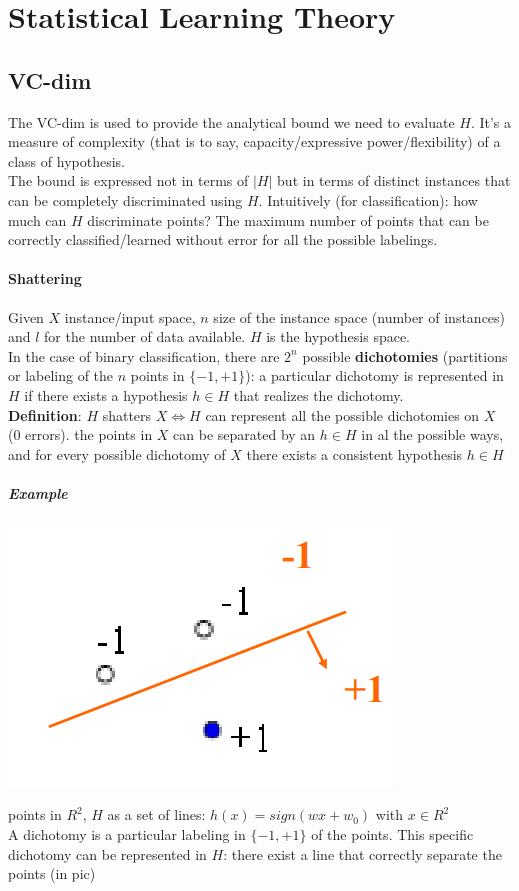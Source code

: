 \documentclass[10pt]{report}
\begin{document}
\section{Statistical Learning Theory}
\subsection{VC-dim} The VC-dim is used to provide the analytical bound we need to evaluate $H$. It's a measure of complexity (that is to say, capacity/expressive power/flexibility) of a class of hypothesis.\\
The bound is expressed not in terms of $|H|$ but in terms of distinct instances that can be completely discriminated using $H$. Intuitively (for classification): how much can $H$ discriminate points? The maximum number of points that can be correctly classified/learned without error for all the possible labelings.
\paragraph{Shattering} Given $X$ instance/input space, $n$ size of the instance space (number of instances) and $l$ for the number of data available. $H$ is the hypothesis space.\\
In the case of binary classification, there are $2^n$ possible \textbf{dichotomies} (partitions or labeling of the $n$ points in $\{-1,+1\}$): a particular dichotomy is represented in $H$ if there exists a hypothesis $h\in H$ that realizes the dichotomy.\\
\textbf{Definition}: $H$ shatters $X \Leftrightarrow H$ can represent all the possible dichotomies on $X$ (0 errors). the points in $X$ can be separated by an $h\in H$ in al the possible ways, and for every possible dichotomy of $X$ there exists a consistent hypothesis $h\in H$
\subparagraph{Example} \begin{multicols}{2}
\begin{center}
	\includegraphics[scale=0.5]{14.png}
\end{center}
 points in $R^2$, $H$ as a set of lines: $h(x) = sign(wx + w_0)$ with $x\in R^2$\\
A dichotomy is a particular labeling in $\{-1,+1\}$ of the points. This specific dichotomy can be represented in $H$: there exist a line that correctly separate the points (in pic)
\end{multicols}
\end{document}
